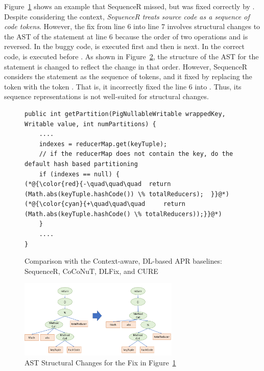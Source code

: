 Figure~\ref{example_3} shows an example that SequenceR missed, but was
fixed correctly by {\tool}. Despite considering the context, {\em
  SequenceR treats source code as a sequence of code tokens}. However,
the fix from line 6 into line 7 involves structural changes to the AST
of the statement at line 6 because the order of two operations
 and \code{\%} is reversed. In the buggy code,  is
executed first and then \code{\%} is next. In the correct code,
\code{\%} is executed before . As shown in
Figure~\ref{tree-change}, the structure of the AST for the statement
is changed to reflect the change in that order. However, SequenceR
considers the statement as the sequence of tokens, and it fixed
by replacing the token  with the token
. That is, it incorrectly fixed the line 6 into
   
\code{\%} . Thus, its sequence representations
is not well-suited for structural changes.


\begin{figure}[t]
	\centering
	\begin{lstlisting}[]
public int getPartition(PigNullableWritable wrappedKey, Writable value, int numPartitions) {
	....
	indexes = reducerMap.get(keyTuple);
	// if the reducerMap does not contain the key, do the default hash based partitioning
	if (indexes == null) {
(*@{\color{red}{-\quad\quad\quad  return (Math.abs(keyTuple.hashCode()) \% totalReducers);	}}@*)
(*@{\color{cyan}{+\quad\quad\quad     return (Math.abs(keyTuple.hashCode() \% totalReducers));}}@*)
	}
	....
}
	\end{lstlisting}
        \vspace{-12pt}
	\caption{Comparison with the Context-aware, DL-based APR baselines: SequenceR, CoCoNuT, DLFix, and CURE}
	\label{example_3}
\end{figure}


\begin{figure}[t]
	\centering
	\includegraphics[width=3in]{graphs/example_3.png}
        \vspace{-6pt}
	\caption{AST Structural Changes for the Fix in Figure~\ref{example_3}}
	\label{tree-change}
\end{figure}


